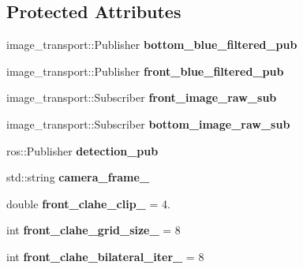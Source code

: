 \subsection*{Protected Attributes}
\begin{DoxyCompactItemize}
\item 
\mbox{\label{classMarkerDropper_a46f35c9468e60bbf6b0804daee3b501b}} 
image\+\_\+transport\+::\+Publisher {\bfseries bottom\+\_\+blue\+\_\+filtered\+\_\+pub}
\item 
\mbox{\label{classMarkerDropper_af48c1237b7c61106f7e86c947ef7e0e8}} 
image\+\_\+transport\+::\+Publisher {\bfseries front\+\_\+blue\+\_\+filtered\+\_\+pub}
\item 
\mbox{\label{classMarkerDropper_a4a5cd2eee6cda56ce177632b446a21cc}} 
image\+\_\+transport\+::\+Subscriber {\bfseries front\+\_\+image\+\_\+raw\+\_\+sub}
\item 
\mbox{\label{classMarkerDropper_ab05e2f71e55e15d2d40bec83aec09e5c}} 
image\+\_\+transport\+::\+Subscriber {\bfseries bottom\+\_\+image\+\_\+raw\+\_\+sub}
\item 
\mbox{\label{classMarkerDropper_a4bda362c08b94bc38433f430c8dce643}} 
ros\+::\+Publisher {\bfseries detection\+\_\+pub}
\item 
\mbox{\label{classMarkerDropper_a12e2db834779b18197b7c5d541f5f566}} 
std\+::string {\bfseries camera\+\_\+frame\+\_\+}
\item 
\mbox{\label{classMarkerDropper_aa98a4125b058fcf57bbed17ee12678e2}} 
double {\bfseries front\+\_\+clahe\+\_\+clip\+\_\+} = 4.
\item 
\mbox{\label{classMarkerDropper_a23c3cd5e393d5fca8d76f7eaf596804d}} 
int {\bfseries front\+\_\+clahe\+\_\+grid\+\_\+size\+\_\+} = 8
\item 
\mbox{\label{classMarkerDropper_a69a9bd6730222d56dee1707c2e5dd599}} 
int {\bfseries front\+\_\+clahe\+\_\+bilateral\+\_\+iter\+\_\+} = 8
\item 
\mbox{\label{classMarkerDropper_a2c7cf4b4b24406a7d684f276fe02b763}} 

\end{DoxyCompactItemize}
